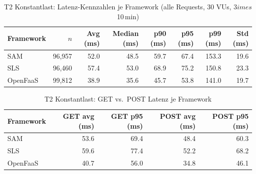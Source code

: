 
\begin{table}[htbp]
  \centering
  \caption{T2 Konstantlast: Latenz-Kennzahlen je Framework (alle Requests, 30 VUs, 3$	imes$10\,min)}
  \label{tab:t2_latenz}
  \begin{tabular}{lrrrrrrr}
    \toprule
    Framework & $n$ & Avg (ms) & Median (ms) & p90 (ms) & p95 (ms) & p99 (ms) & Std (ms) \\
    \midrule
    SAM & 96,957 & 52.0 & 48.5 & 59.7 & 67.4 & 153.3 & 19.6 \\
    SLS & 96,460 & 57.4 & 53.0 & 68.9 & 75.2 & 150.8 & 23.3 \\
    OpenFaaS & 99,812 & 38.9 & 35.6 & 45.7 & 53.8 & 141.0 & 19.7 \\
    \bottomrule
  \end{tabular}
\end{table}


\begin{table}[htbp]
  \centering
  \caption{T2 Konstantlast: GET vs.\ POST Latenz je Framework}
  \label{tab:t2_get_post}
  \begin{tabular}{lrrrr}
    \toprule
    Framework & GET avg (ms) & GET p95 (ms) & POST avg (ms) & POST p95 (ms) \\
    \midrule
    SAM & 53.6 & 69.4 & 48.4 & 60.3 \\
    SLS & 59.6 & 77.4 & 52.2 & 68.2 \\
    OpenFaaS & 40.7 & 56.0 & 34.8 & 46.1 \\
    \bottomrule
  \end{tabular}
\end{table}
